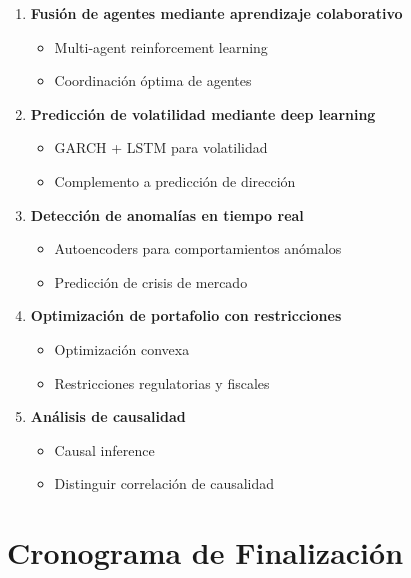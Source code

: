 \documentclass[12pt,a4paper]{article}
\begin{document}
\begin{enumerate}
    \item \textbf{Fusión de agentes mediante aprendizaje colaborativo}
    \begin{itemize}
        \item Multi-agent reinforcement learning
        \item Coordinación óptima de agentes
    \end{itemize}

    \item \textbf{Predicción de volatilidad mediante deep learning}
    \begin{itemize}
        \item GARCH + LSTM para volatilidad
        \item Complemento a predicción de dirección
    \end{itemize}

    \item \textbf{Detección de anomalías en tiempo real}
    \begin{itemize}
        \item Autoencoders para comportamientos anómalos
        \item Predicción de crisis de mercado
    \end{itemize}

    \item \textbf{Optimización de portafolio con restricciones}
    \begin{itemize}
        \item Optimización convexa
        \item Restricciones regulatorias y fiscales
    \end{itemize}

    \item \textbf{Análisis de causalidad}
    \begin{itemize}
        \item Causal inference
        \item Distinguir correlación de causalidad
    \end{itemize}
\end{enumerate}

\section{Cronograma de Finalización}
\end{document}
